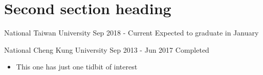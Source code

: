\section{Second section heading}

	{National Taiwan University}
	{Sep 2018 - Current}
	{Expected to graduate in January}

	{National Cheng Kung University}
	{Sep 2013 - Jun 2017}
	{Completed}

\begin{itemize}
	\item This one has just one tidbit of interest
\end{itemize}
